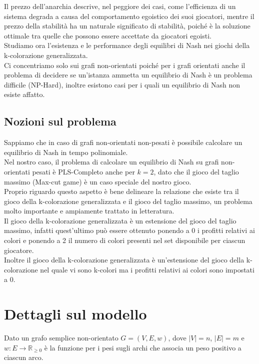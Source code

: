 Il prezzo dell'anarchia descrive, nel peggiore dei casi, come l'efficienza di un sistema degrada a causa del comportamento egoistico dei suoi giocatori, mentre il prezzo della stabilità ha un naturale significato di stabilità, poiché è la soluzione ottimale tra quelle che possono essere accettate da giocatori egoisti.\\

Studiamo ora l'esistenza e le performance degli equilibri di Nash nei giochi della k-colorazione generalizzata.\\

Ci concentriamo solo sui grafi non-orientati poiché per i grafi orientati anche il problema di decidere se un'istanza ammetta un equilibrio di Nash è un problema difficile (NP-Hard), inoltre esistono casi per i quali un equilibrio di Nash non esiste affatto.\\

\subsection{Nozioni sul problema}
\justify
Sappiamo che in caso di grafi non-orientati non-pesati è possibile calcolare un equilibrio di Nash in tempo polinomiale.\\

Nel nostro caso, il problema di calcolare un equilibrio di Nash su grafi non-orientati pesati è PLS-Completo anche per \(k = 2\), dato che il gioco del taglio massimo (Max-cut game) è un caso speciale del nostro gioco.\\

Proprio riguardo questo aspetto è bene delineare la relazione che esiste tra il gioco della k-colorazione generalizzata e il gioco del taglio massimo, un problema molto importante e ampiamente trattato in letteratura.\\

Il gioco della k-colorazione generalizzata è un estensione del gioco del taglio massimo, infatti quest'ultimo può essere ottenuto ponendo a 0 i profitti relativi ai colori e ponendo a 2 il numero di colori presenti nel set disponibile per ciascun giocatore.\\

Inoltre il gioco della k-colorazione generalizzata è un'estensione del gioco della k-colorazione nel quale vi sono k-colori ma i profitti relativi ai colori sono impostati a 0.\\

\section{Dettagli sul modello}
\justify
Dato un grafo semplice non-orientato \(G = (V, E, w)\), dove \(|V| = n\), \(|E| = m\) e \(w : E\rightarrow\mathds{R}_{\geq 0}\) è la funzione per i pesi sugli archi che associa un peso positivo a ciascun arco.\\


